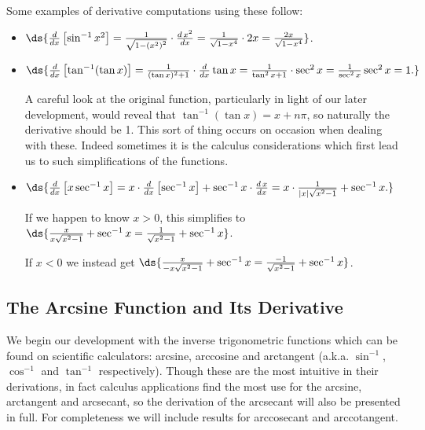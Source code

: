 Some examples of derivative computations using these follow:
\begin{itemize}
\item $\ds{\frac{d}{dx}\left[\sin^{-1}x^2\right]
 =\frac{1}{\sqrt{1-\left(x^2\right)^2}}\cdot\frac{d\,x^2}{dx}
 =\frac1{\sqrt{1-x^4}}\cdot2x=\frac{2x}{\sqrt{1-x^4}}}$.
\item $\ds{\frac{d}{dx}\left[\tan^{-1}(\tan x)\right]
 =\frac1{(\tan x)^2+1}\cdot\frac{d}{dx}\tan x
 =\frac{1}{\tan^2x+1}\cdot\sec^2x
 =\frac{1}{\sec^2x}\sec^2x=1.}$

A careful look at the original function, particularly in 
light of our later development,  would reveal that 
$\tan^{-1}(\tan x)=x+n\pi$, so naturally the derivative should be 1.
This sort of thing occurs on occasion when dealing with these.  Indeed
sometimes it is the calculus considerations which first lead us
to such simplifications of the functions.
\item $\ds{\frac{d}{dx}\left[x\sec^{-1}x\right]
  =x\cdot\frac{d}{dx}\left[\sec^{-1}x\right]+\sec^{-1}x\cdot\frac{d\,x}{dx}
  =x\cdot\frac{1}{|x|\sqrt{x^2-1}}+\sec^{-1}x.}$

If we happen to know $x>0$, this simplifies to
$\ds{\frac{x}{x\sqrt{x^2-1}}+\sec^{-1}x=\frac1{\sqrt{x^2-1}}+\sec^{-1}x}$. 

If $x<0$ we instead get
$\ds{\frac{x}{-x\sqrt{x^2-1}}+\sec^{-1}x=\frac{-1}{\sqrt{x^2-1}}+\sec^{-1}x}$.

\end{itemize}













\subsection{The Arcsine Function and Its Derivative}

We begin our development with the inverse trigonometric functions which
can be found on scientific calculators: arcsine, arccosine and arctangent
(a.k.a. $\sin^{-1}$, $\cos^{-1}$
and $\tan^{-1}$ respectively).  Though these are the most intuitive in 
their derivations, in fact calculus applications find 
the most use for the arcsine, arctangent and arcsecant,
so the derivation of the arcsecant will also be presented in
full.  For completeness
we will include results for  arccosecant and arccotangent.

